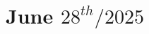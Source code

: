 \documentclass[../main.tex]{subfiles}
\begin{document}
\chapter{June $28^{th} / 2025$}
\label{ch:tufte-design}
\end{document}
